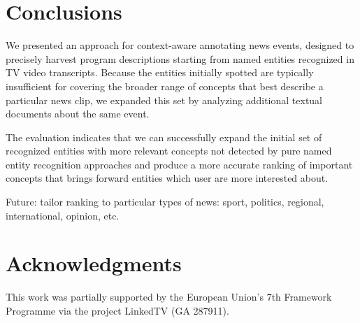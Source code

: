 \documentclass{llncs}
\begin{document}
\section{Conclusions}
\label{sec:conclusions}

We presented an approach for context-aware annotating news events, designed to precisely harvest program descriptions starting from named entities recognized in TV video transcripts. Because the entities initially spotted are typically insufficient for covering the broader range of concepts that best describe a particular news clip, we expanded this set by analyzing additional textual documents about the same event.

The evaluation indicates that we can successfully expand the initial set of recognized entities with more relevant concepts not detected by pure named entity recognition approaches and produce a more accurate ranking of important concepts that brings forward entities which user are more interested about.

Future: tailor ranking to particular types of news: sport, politics, regional, international, opinion, etc.


\section*{Acknowledgments}
This work was partially supported by the European Union's 7th Framework Programme via the project LinkedTV (GA 287911).



\end{document}
